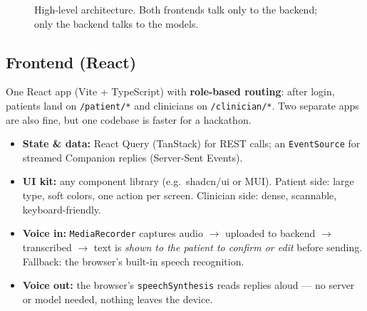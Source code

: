 \documentclass[11pt]{article}
\begin{document}
\begin{figure}[h]
{}
\caption{High-level architecture. Both frontends talk only to the backend; only the backend talks to the models.}
\label{fig:arch}
\end{figure}

\subsection{Frontend (React)}
One React app (Vite + TypeScript) with \textbf{role-based routing}: after login, patients land on \texttt{/patient/*} and clinicians on
\texttt{/clinician/*}. Two separate apps are also fine, but one codebase is faster for a hackathon.
\begin{itemize}
  \item \textbf{State \& data:} React Query (TanStack) for REST calls; an \texttt{EventSource} for streamed Companion replies (Server-Sent Events).
  \item \textbf{UI kit:} any component library (e.g.\ shadcn/ui or MUI). Patient side: large type, soft colors, one action per screen.
        Clinician side: dense, scannable, keyboard-friendly.
  \item \textbf{Voice in:} \texttt{MediaRecorder} captures audio $\rightarrow$ uploaded to backend $\rightarrow$ transcribed $\rightarrow$
        text is \emph{shown to the patient to confirm or edit} before sending. Fallback: the browser's built-in speech recognition.
  \item \textbf{Voice out:} the browser's \texttt{speechSynthesis} reads replies aloud --- no server or model needed, nothing leaves the device.
\end{itemize}
\end{document}
